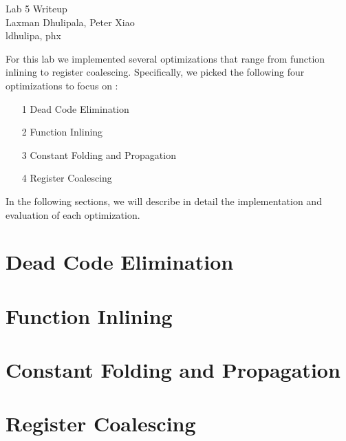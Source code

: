 \documentclass[11pt]{article}
\newcommand{\myname}{Laxman Dhulipala, Peter Xiao}
\newcommand{\myandrew}{ldhulipa, phx}
\begin{document}
\medskip                        %

\thispagestyle{plain}
\begin{center}                  %
{\Large Lab 5 Writeup} \\
 \vspace{2 mm}
\myname \\
\myandrew
\end{center}

For this lab we implemented several optimizations that range from function inlining
to register coalescing. Specifically, we picked the following four optimizations to focus
on : 

\begin{itemize}
  \item[1] Dead Code Elimination
  \item[2] Function Inlining
  \item[3] Constant Folding and Propagation
  \item[4] Register Coalescing
\end{itemize}

In the following sections, we will describe in detail the implementation and evaluation of 
each optimization. 

\section{Dead Code Elimination}

\section{Function Inlining}

\section{Constant Folding and Propagation}

\section{Register Coalescing}
\end{document}
